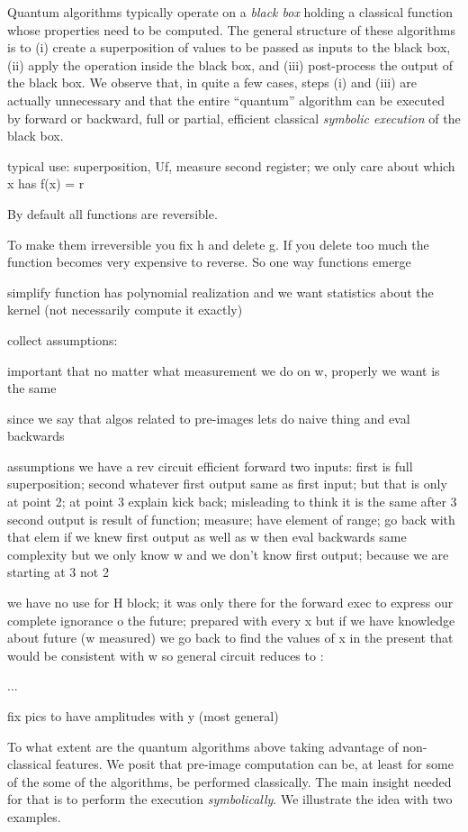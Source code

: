 \documentclass{article}
\begin{document}
\begin{refsection}
Quantum algorithms typically operate on a \emph{black box} holding a
classical function whose properties need to be computed. The general
structure of these algorithms is to (i) create a superposition of
values to be passed as inputs to the black box, (ii) apply the
operation inside the black box, and (iii) post-process the output of
the black box. We observe that, in quite a few cases, steps (i) and
(iii) are actually unnecessary and that the entire ``quantum''
algorithm can be executed by forward or backward, full or partial,
efficient classical \emph{symbolic execution} of the black box.


typical use: superposition, Uf, measure second register; we only care
about which x has f(x) = r

By default all functions are reversible. 

To make them irreversible you fix h and delete g. If you delete too
much the function becomes very expensive to reverse. So one way
functions emerge


simplify function has polynomial realization and we want
statistics about the kernel (not necessarily compute it exactly)



collect assumptions:


important that no matter what measurement we do on w, properly we want is the same


since we say that algos related to pre-images lets do naive thing and eval backwards

assumptions we have a rev circuit efficient forward
two inputs: first is full superposition; second whatever
first output same as first input; but that is only at point 2; at point 3 explain kick back; misleading to think it is the same after 3
second output is result of function; measure; have element of range; go back with that elem
if we knew first output as well as w then eval backwards same complexity but we only know w and we don't know first output; because we are starting at 3 not 2

we have no use for H block; it was only there for the forward exec to express our complete ignorance o the future; prepared with every x but if we have knowledge about future (w measured) we go back to find the values of x in the present that would be consistent with w so general circuit reduces to :

...

fix pics to have amplitudes with y (most general)

To what extent are the quantum algorithms above taking advantage of
non-classical features. We posit that pre-image computation can be, at
least for some of the some of the algorithms, be performed
classically. The main insight needed for that is to perform the
execution \emph{symbolically}. We illustrate the idea with two
examples.


\end{refsection}
\end{document}
